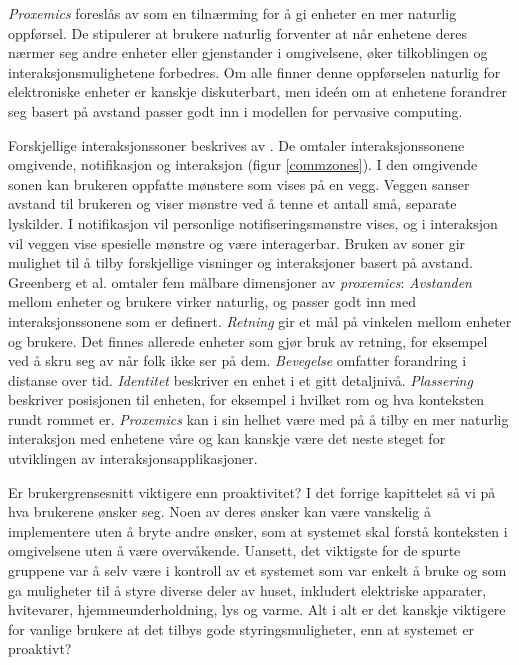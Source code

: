 {\emph{Proxemics} foreslås av \citet{greenberg11} som en tilnærming for å gi enheter en mer naturlig oppførsel. De stipulerer at brukere naturlig forventer at når enhetene deres nærmer seg andre enheter eller gjenstander i omgivelsene, øker tilkoblingen og interaksjonsmulighetene forbedres. Om alle finner denne oppførselen naturlig for elektroniske enheter er kanskje diskuterbart, men ideén om at enhetene forandrer seg basert på avstand passer godt inn i modellen for pervasive computing.

Forskjellige interaksjonssoner beskrives av \citet{streitz05}. De omtaler interaksjonssonene omgivende, notifikasjon og interaksjon (figur \ref{commzones}). I den omgivende sonen kan brukeren oppfatte mønstere som vises på en vegg. Veggen sanser avstand til brukeren og viser mønstre ved å tenne et antall små, separate lyskilder. I notifikasjon vil personlige notifiseringsmønstre vises, og i interaksjon vil veggen vise spesielle mønstre og være interagerbar. Bruken av soner gir mulighet til å tilby forskjellige visninger og interaksjoner basert på avstand. Greenberg et al. omtaler fem målbare dimensjoner av \emph{proxemics}: \emph{Avstanden} mellom enheter og brukere virker naturlig, og passer godt inn med interaksjonssonene som er definert. \emph{Retning} gir et mål på vinkelen mellom enheter og brukere. Det finnes allerede enheter som gjør bruk av retning, for eksempel ved å skru seg av når folk ikke ser på dem. \emph{Bevegelse} omfatter forandring i distanse over tid. \emph{Identitet} beskriver en enhet i et gitt detaljnivå. \emph{Plassering} beskriver posisjonen til enheten, for eksempel i hvilket rom og hva konteksten rundt rommet er. \emph{Proxemics} kan i sin helhet være med på å tilby en mer naturlig interaksjon med enhetene våre og kan kanskje være det neste steget for utviklingen av interaksjonsapplikasjoner.
}

Er brukergrensesnitt viktigere enn proaktivitet?
I det forrige kapittelet så vi på hva brukerene ønsker seg. Noen av deres ønsker kan være vanskelig å implementere uten å bryte andre ønsker, som at systemet skal forstå konteksten i omgivelsene uten å være overvåkende. Uansett, det viktigste for de spurte gruppene var å selv være i kontroll av et systemet som var enkelt å bruke og som ga muligheter til å styre diverse deler av huset, inkludert elektriske apparater, hvitevarer, hjemmeunderholdning, lys og varme. Alt i alt er det kanskje viktigere for vanlige brukere at det tilbys gode styringsmuligheter, enn at systemet er proaktivt?


